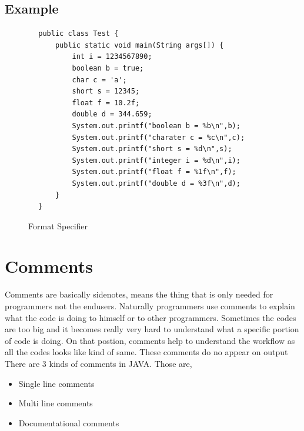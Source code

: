 \documentclass[openany]{book}  %
\begin{document}
\begin{flushleft}
    \subsection{Example}
    \begin{center}
        \begin{verbatim}
        public class Test {
            public static void main(String args[]) {
                int i = 1234567890;
                boolean b = true;
                char c = 'a';
                short s = 12345;
                float f = 10.2f;
                double d = 344.659;
                System.out.printf("boolean b = %b\n",b);
                System.out.printf("charater c = %c\n",c);
                System.out.printf("short s = %d\n",s);
                System.out.printf("integer i = %d\n",i);
                System.out.printf("float f = %1f\n",f);
                System.out.printf("double d = %3f\n",d);
            }
        }
    \end{verbatim}
    \end{center}
    \begin{figure}[htbp]
        \begin{center}
            \caption{Format Specifier\cite{Ref5}\cite{Ref3}}
        \end{center}
    \end{figure}
    \section{Comments}
    Comments are basically sidenotes, means the thing that is only needed for programmers not the endusers. Naturally  programmers use comments to explain what the code is doing to himself
    or to other programmers. Sometimes the codes are too big and it becomes really very hard to understand what a specific portion of code is doing. On that postion, comments help to understand
    the workflow as all the codes looks like kind of same. These comments do no appear on output There are 3 kinds of comments in JAVA. Those are,
    \begin{itemize}
        \item Single line comments
        \item Multi line comments
        \item Documentational comments
    \end{itemize}

\end{flushleft}
\end{document}
